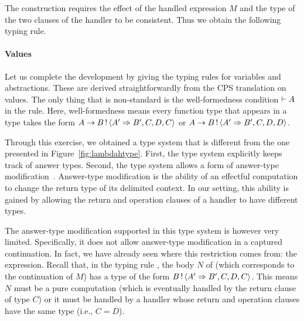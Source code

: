 \bigskip

\noindent The construction requires the effect of the handled expression $M$
and the type of the two clauses of the handler to be consistent.
Thus we obtain the following typing rule.


\paragraph{Values}

Let us complete the development by giving the typing rules for variables
and abstractions.
These are derived straightforwardly from the CPS translation on values.
The only thing that is non-standard is the well-formedness condition
$\vdash A$ in the  rule.
Here, well-formedness means every function type that appears in a type
takes the form
$A \rightarrow B \, ! \, \langle A^\prime \Rightarrow B^\prime, C, D, C \rangle$ or
$A \rightarrow B \, ! \, \langle A^\prime \Rightarrow B^\prime, C, D, D \rangle$.


Through this exercise, we obtained a type system that is different from
the one presented in Figure~\ref{fig:lambdahtype}.
First, the type system explicitly keeps track of answer types.
Second, the type system allows a form of answer-type
modification~\cite{danvy-context,asai-printf,kobori-atm}.
Answer-type modification is the ability of an effectful computation to
change the return type of its delimited context.
In our setting, this ability is gained by allowing the return and operation
clauses of a handler to have different types.

The answer-type modification supported in this type system is however very
limited.
Specifically, it does not allow answer-type modification in a captured
continuation.
In fact, we have already seen where this restriction comes from: the 
expression.
Recall that, in the typing rule , the body $N$ of 
(which corresponds to the continuation of $M$) has a type of the form
$B \, ! \, \langle A^\prime \Rightarrow B^\prime, C, D, C \rangle$.
This means $N$ must be a pure computation (which is eventually handled by
the return clause of type $C$) or it must be handled by a handler whose
return and operation clauses have the same type (i.e., $C = D$).


